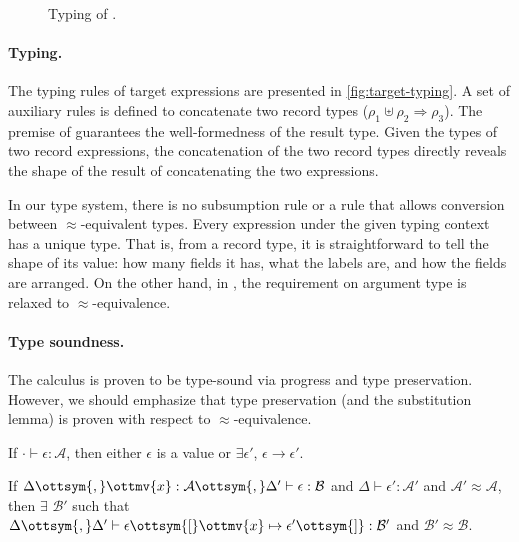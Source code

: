\begin{figure}[t]
  \small
  \ottdefnsConcatTypes
  \ottdefnsTargetTyping
  \caption{Typing of \lambdar.}\label{fig:target-typing}
\end{figure}

\paragraph{Typing.}
The typing rules of target expressions are presented in
\autoref{fig:target-typing}. A set of auxiliary rules is defined to concatenate
two record types ($ \rho_{{\mathrm{1}}} \uplus \rho_{{\mathrm{2}}} \Rightarrow \rho_{{\mathrm{3}}} $). The premise of  guarantees
the well-formedness of the result type. Given the types of two record
expressions, the concatenation of the two record types directly reveals the
shape of the result of concatenating the two expressions.

In our type system, there is no subsumption rule or a rule that allows
conversion between $ \approx $-equivalent types. Every expression under the given
typing context has a unique type. That is, from a record type, it is
straightforward to tell the shape of its value: how many fields it has, what the
labels are, and how the fields are arranged. On the other hand, in
, the requirement on argument type is relaxed to
$ \approx $-equivalence.

\paragraph{Type soundness.}
The \lambdar calculus is proven to be type-sound via progress and type
preservation. However, we should emphasize that type preservation (and the
substitution lemma) is proven with respect to $ \approx $-equivalence.

\begin{theorem}[Progress]\label{thm:type-progress}
  If $ \cdot   \vdash  \epsilon  :  \mathcal{A}$, then either $\epsilon$ is a value or
  $\exists \epsilon'$, $\epsilon  \rightarrow  \epsilon'$.
\end{theorem}

\begin{lemma}\label{thm:subst-term}
  If $\Delta  \ottsym{,}  \ottmv{x}  :  \mathcal{A}  \ottsym{,}  \Delta'  \vdash  \epsilon  :  \mathcal{B}$ and $\Delta  \vdash  \epsilon'  :  \mathcal{A}'$ and $\mathcal{A}'  \approx  \mathcal{A}$,
  then $\exists$ $\mathcal{B}'$ such that $\Delta  \ottsym{,}  \Delta'  \vdash  \epsilon  \ottsym{[}  \ottmv{x}  \mapsto  \epsilon'  \ottsym{]}  :  \mathcal{B}'$ and $\mathcal{B}'  \approx  \mathcal{B}$.
\end{lemma}


